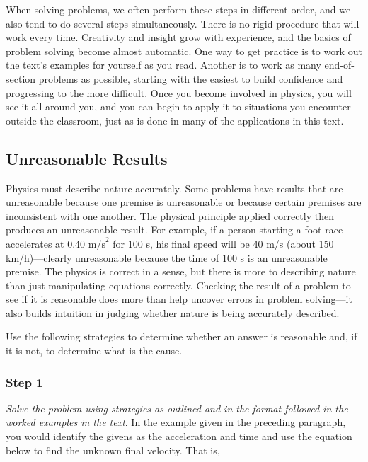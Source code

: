 \documentclass[
]{book}
\begin{document}
When solving problems, we often perform these steps in different order,
and we also tend to do several steps simultaneously. There is no rigid
procedure that will work every time. Creativity and insight grow with
experience, and the basics of problem solving become almost automatic.
One way to get practice is to work out the text's examples for yourself
as you read. Another is to work as many end-of-section problems as
possible, starting with the easiest to build confidence and progressing
to the more difficult. Once you become involved in physics, you will see
it all around you, and you can begin to apply it to situations you
encounter outside the classroom, just as is done in many of the
applications in this text.

\hypertarget{fs-id2176647}{}
\hypertarget{unreasonable-results}{%
\subsection{Unreasonable Results}\label{unreasonable-results}}

Physics must describe nature accurately. Some problems have results that
are unreasonable because one premise is unreasonable or because certain
premises are inconsistent with one another. The physical principle
applied correctly then produces an unreasonable result. For example, if
a person starting a foot race accelerates at
\({0\text{.}\text{40\ m/s}^{2}}{}\) for 100 s, his final speed will be 40
m/s (about 150 km/h)---clearly unreasonable because the time of 100 s is
an unreasonable premise. The physics is correct in a sense, but there is
more to describing nature than just manipulating equations correctly.
Checking the result of a problem to see if it is reasonable does more
than help uncover errors in problem solving---it also builds intuition
in judging whether nature is being accurately described.

Use the following strategies to determine whether an answer is
reasonable and, if it is not, to determine what is the cause.

\hypertarget{fs-id1987367}{}
\hypertarget{step-1-1}{%
\subsubsection{Step 1}\label{step-1-1}}

\emph{Solve the problem using strategies as outlined and in the format
followed in the worked examples in the text}. In the example given in
the preceding paragraph, you would identify the givens as the
acceleration and time and use the equation below to find the unknown
final velocity. That is,
\end{document}
